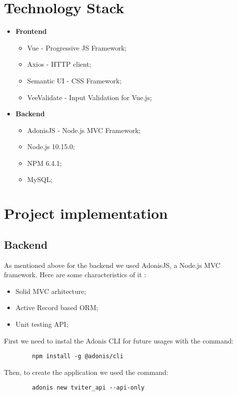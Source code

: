 \section{Technology Stack}
\begin{itemize}
	\item \textbf{Frontend} 
	\begin{itemize}
		\item Vue - Progressive JS Framework;
		\item Axios - HTTP client;
		\item Semantic UI - CSS Framework;
		\item VeeValidate - Input Validation for Vue.js;
	\end{itemize}
	
	\item \textbf{Backend}
	\begin{itemize}
		\item AdonisJS - Node.js MVC Framework; 
		\item Node.js 10.15.0;
		\item NPM 6.4.1;
		\item MySQL;
	\end{itemize}	
\end{itemize}

\section{Project implementation}
\subsection{Backend}
	As mentioned above for the backend we used AdonisJS, a Node.js MVC framework. Here are some characteristics of it : 
	\begin{itemize}
		\item Solid MVC arhitecture;
		\item Active Record based ORM;
		\item Unit testing API;
	\end{itemize}

	First we need to instal the Adonis CLI for future usages with the command:
	\begin{verbatim}
		npm install -g @adonis/cli
	\end{verbatim}
	
	Then, to create the application we used the command:
	\begin{verbatim}
		adonis new tviter_api --api-only
	\end{verbatim}
	
